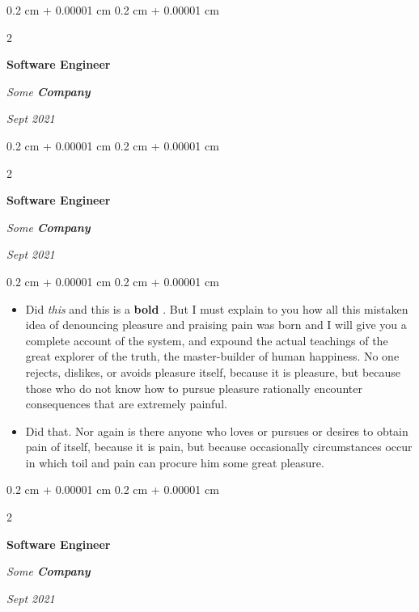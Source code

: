 \documentclass[10pt, letterpaper]{article}
\newenvironment{highlights}{
    \begin{itemize}[
        topsep=0.10 cm,
        parsep=0.10 cm,
        partopsep=0pt,
        itemsep=0pt,
        leftmargin=0.4 cm + 10pt
    ]
}{
    \end{itemize}
} %
\newenvironment{onecolentry}{
    \begin{adjustwidth}{
        0.2 cm + 0.00001 cm
    }{
        0.2 cm + 0.00001 cm
    }
}{
    \end{adjustwidth}
} %
\newenvironment{twocolentry}[2][]{
    \onecolentry
    \def\secondColumn{#2}
    \setcolumnwidth{\fill, 4.5 cm}
    \begin{paracol}{2}
}{
    \switchcolumn \raggedleft \secondColumn
    \end{paracol}
    \endonecolentry
} %
\let\hrefWithoutArrow\href
\renewcommand{\href}[2]{\hrefWithoutArrow{#1}{\ifthenelse{\equal{#2}{}}{ }{#2 }\raisebox{.15ex}{\footnotesize \faExternalLink*}}}
\begin{document}
        \vspace{0.2 cm}

        \begin{twocolentry}{
            
            
        \textit{Sept 2021}}
            \textbf{Software Engineer}
            
            \textit{Some \textbf{Company}}
        \end{twocolentry}



        \vspace{0.2 cm}

        \begin{twocolentry}{
            
            
        \textit{Sept 2021}}
            \textbf{Software Engineer}
            
            \textit{Some \textbf{Company}}
        \end{twocolentry}

        \vspace{0.10 cm}
        \begin{onecolentry}
            \begin{highlights}
                \item Did \textit{this} and this is a \textbf{bold} \href{https://example.com}{link}. But I must explain to you how all this mistaken idea of denouncing pleasure and praising pain was born and I will give you a complete account of the system, and expound the actual teachings of the great explorer of the truth, the master-builder of human happiness. No one rejects, dislikes, or avoids pleasure itself, because it is pleasure, but because those who do not know how to pursue pleasure rationally encounter consequences that are extremely painful.
                \item Did that. Nor again is there anyone who loves or pursues or desires to obtain pain of itself, because it is pain, but because occasionally circumstances occur in which toil and pain can procure him some great pleasure.
            \end{highlights}
        \end{onecolentry}


        \vspace{0.2 cm}

        \begin{twocolentry}{
            
            
        \textit{Sept 2021}}
            \textbf{Software Engineer}
            
            \textit{Some \textbf{Company}}
        \end{twocolentry}
\end{document}
